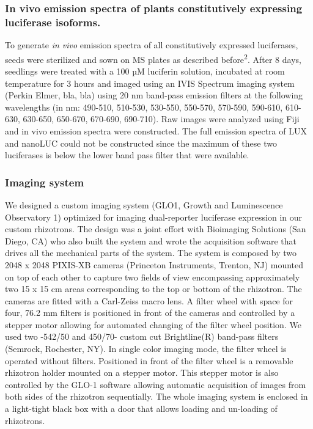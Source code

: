 \documentclass[]{article}
\begin{document}
\subsubsection{\texorpdfstring{\textbf{In vivo emission spectra of
plants constitutively expressing luciferase
isoforms}.}{In vivo emission spectra of plants constitutively expressing luciferase isoforms.}}\label{in-vivo-emission-spectra-of-plants-constitutively-expressing-luciferase-isoforms.}

To generate \emph{in vivo} emission spectra of all constitutively
expressed luciferases, seeds were sterilized and sown on MS plates as
described before\textsuperscript{2}. After 8 days, seedlings were
treated with a 100 µM luciferin solution, incubated at room temperature
for 3 hours and imaged using an IVIS Spectrum imaging system (Perkin
Elmer, bla, bla) using 20 nm band-pass emission filters at the following
wavelengths (in nm: 490-510, 510-530, 530-550, 550-570, 570-590,
590-610, 610-630, 630-650, 650-670, 670-690, 690-710). Raw images were
analyzed using Fiji and in vivo emission spectra were constructed. The
full emission spectra of LUX and nanoLUC could not be constructed since
the maximum of these two luciferases is below the lower band pass filter
that were available.

\subsubsection{Imaging system}\label{imaging-system}

We designed a custom imaging system (GLO1, Growth and Luminescence
Observatory 1) optimized for imaging dual-reporter luciferase expression
in our custom rhizotrons. The design was a joint effort with Bioimaging
Solutions (San Diego, CA) who also built the system and wrote the
acquisition software that drives all the mechanical parts of the system.
The system is composed by two 2048 x 2048 PIXIS-XB cameras (Princeton
Instruments, Trenton, NJ) mounted on top of each other to capture two
fields of view encompassing approximately two 15 x 15 cm areas
corresponding to the top or bottom of the rhizotron. The cameras are
fitted with a Carl-Zeiss macro lens. A filter wheel with space for four,
76.2 mm filters is positioned in front of the cameras and controlled by
a stepper motor allowing for automated changing of the filter wheel
position. We used two -542/50 and 450/70- custom cut Brightline(R)
band-pass filters (Semrock, Rochester, NY). In single color imaging
mode, the filter wheel is operated without filters. Positioned in front
of the filter wheel is a removable rhizotron holder mounted on a stepper
motor. This stepper motor is also controlled by the GLO-1 software
allowing automatic acquisition of images from both sides of the
rhizotron sequentially. The whole imaging system is enclosed in a
light-tight black box with a door that allows loading and un-loading of
rhizotrons.
\end{document}
